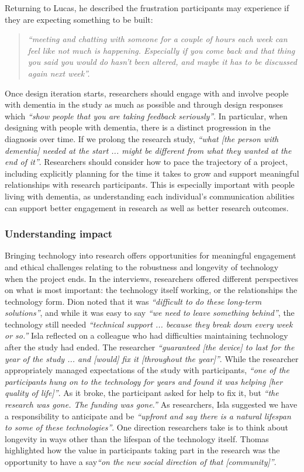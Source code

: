Returning to Lucas, he described the frustration participants may experience if they are expecting something to be built: 

\begin{quote}
\textit{``meeting and chatting with someone for a couple of hours each week can feel like not much is happening. Especially if you come back and that thing you said you would do hasn't been altered, and maybe it has to be discussed again next week''. }
\end{quote}

Once design iteration starts, researchers should engage with and involve people with dementia in the study as much as possible and through design responses which \textit{``show people that you are taking feedback seriously''}. In particular, when designing with people with dementia, there is a distinct progression in the diagnosis over time. If we prolong the research study, \textit{``what [the person with dementia] needed at the start ... might be different from what they wanted at the end of it''}. Researchers should consider how to pace the trajectory of a project, including explicitly planning for the time it takes to grow and support meaningful relationships with research participants. This is especially important with people living with dementia, as understanding each individual's communication abilities can support better engagement in research as well as better research outcomes.

\subsubsection{Understanding impact}
\label{Ethics:ThemePartTwo:Impact}
Bringing technology into research offers opportunities for meaningful engagement and ethical challenges relating to the robustness and longevity of technology when the project ends. In the interviews, researchers offered different perspectives on what is most important: the technology itself working, or the relationships the technology form. Dion noted that it was \textit{``difficult to do these long-term solutions''}, and while it was easy to say \textit{``we need to leave something behind''}, the technology still needed \textit{``technical support ... because they break down every week or so.''} Isla reflected on a colleague who had difficulties maintaining technology after the study had ended. The researcher \textit{``guaranteed [the device] to last for the year of the study ... and [would] fix it [throughout the year]''}. While the researcher appropriately managed expectations of the study with participants, \textit{``one of the participants hung on to the technology for years and found it was helping [her quality of life]''}. As it broke, the participant asked for help to fix it, but \textit{``the research was gone. The funding was gone.''} As researchers, Isla suggested we have a responsibility to anticipate and be \textit{``upfront and say there is a natural lifespan to some of these technologies''}. One direction researchers take is to think about longevity in ways other than the lifespan of the technology itself. Thomas highlighted how the value in participants taking part in the research was the opportunity to have a say\textit{``on the new social direction of that [community]''}.

